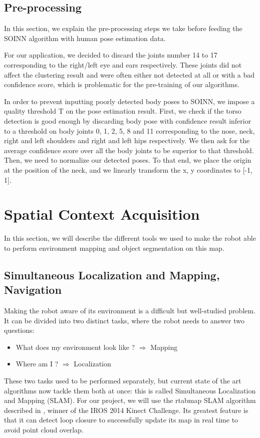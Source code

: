 \subsection{Pre-processing}
In this section, we explain the pre-processing steps we take before feeding the SOINN algorithm with human pose estimation data.

For our application, we decided to discard the joints number 14 to 17 corresponding to the right/left eye and ears respectively. These joints did not affect the clustering result and were often either not detected at all or with a bad confidence score, which is problematic for the pre-training of our algorithms.

In order to prevent inputting poorly detected body poses to SOINN, we impose a quality threshold T on the pose estimation result. First, we check if the torso detection is good enough by discarding body pose with confidence result inferior to a threshold on body joints 0, 1, 2, 5, 8 and 11 corresponding to the nose, neck, right and left shoulders and right and left hips respectively. We then ask for the average confidence score over all the body joints to be superior to that threshold.
Then, we need to normalize our detected poses. To that end, we place the origin at the position of the neck, and we linearly transform the x, y coordinates to [-1, 1].

\section{Spatial Context Acquisition}
In this section, we will describe the different tools we used to make the robot able to perform environment mapping and object segmentation on this map.

\subsection{Simultaneous Localization and Mapping, Navigation}
Making the robot aware of its environment is a difficult but well-studied problem. It can be divided into two distinct tasks, where the robot needs to answer two questions:
\begin{itemize}
    \item{What does my environment look like ? $\Rightarrow$ Mapping}
    \item{Where am I ? $\Rightarrow$ Localization}
\end{itemize}

These two tasks used to be performed separately, but current state of the art algorithms now tackle them both at once: this is called Simultaneous Localization and Mapping (SLAM). For our project, we will use the rtabmap SLAM algorithm described in \cite{rtabmap}, winner of the IROS 2014 Kinect Challenge. Its greatest feature is that it can detect loop closure to successfully update its map in real time to avoid point cloud overlap.

